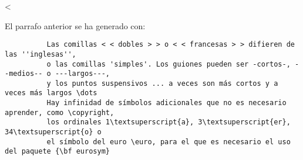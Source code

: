 <\documentclass[11pt,letter]{article} %
\begin{document}
          El parrafo anterior se ha generado con:

          \begin{verbatim}
          Las comillas < < dobles > > o < < francesas > > difieren de las ''inglesas'',
          o las comillas 'simples'. Los guiones pueden ser -cortos-, --medios-- o ---largos---,
          y los puntos suspensivos ... a veces son más cortos y a veces más largos \dots
          Hay infinidad de símbolos adicionales que no es necesario aprender, como \copyright,
          los ordinales 1\textsuperscript{a}, 3\textsuperscript{er}, 34\textsuperscript{o} o 
          el símbolo del euro \euro, para el que es necesario el uso del paquete {\bf eurosym}

          \end{verbatim}

     
\end{document}
